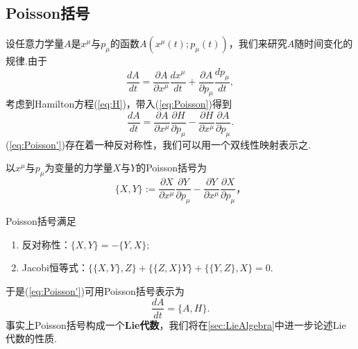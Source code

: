 \documentclass[10pt]{article}
\begin{document}
\subsection{Poisson括号}
	设任意力学量$A$是$x^\mu$与$p_\mu$的函数$A(x^\mu(t);p_\mu(t))$，我们来研究$A$随时间变化的规律.由于
	\begin{equation}\label{eq:Poisson}
	\frac{dA}{dt}=\frac{\partial A}{\partial x^\mu}\frac{d x^\mu}{dt}+\frac{\partial A}{\partial p_\mu}\frac{dp_\mu}{dt},
	\end{equation}
	考虑到Hamilton方程(\ref{eq:H})，带入(\ref{eq:Poisson})得到
	\begin{equation}\label{eq:Poisson'}
	\frac{dA}{dt}=\frac{\partial A}{\partial x^\mu}\frac{\partial H}{\partial p_\mu}-\frac{\partial H}{\partial x^\mu}\frac{\partial A}{\partial p_\mu}.
	\end{equation}
	(\ref{eq:Poisson'})存在着一种反对称性，我们可以用一个双线性映射表示之.
	\begin{definition}
	以$x^\mu$与$p_\mu$为变量的力学量$X$与$Y$的Poisson括号为
	\begin{equation}\label{eq:PB}
		\{X,Y\}:=\frac{\partial X}{\partial x^\mu}\frac{\partial Y}{\partial p_\mu}-\frac{\partial Y}{\partial x^\mu}\frac{\partial X}{\partial p_\mu}，
	\end{equation}
	\end{definition}
	\begin{lemma}
		Poisson括号满足
		\begin{enumerate}
			\item 反对称性：$\{X,Y\}=-\{Y,X\}$;
			\item Jacobi恒等式：$\{\{X,Y\},Z\}+\{\{Z,X\}Y\}+\{\{Y,Z\},X\}=0$.
		\end{enumerate}
	\end{lemma}
	于是(\ref{eq:Poisson'})可用Poisson括号表示为
	\begin{equation}
	\frac{dA}{dt}=\{A,H\}.
	\end{equation}
	事实上Poisson括号构成一个\textbf{Lie代数}，我们将在\ref{sec:LieAlgebra}中进一步论述Lie代数的性质.
	
\end{document}
